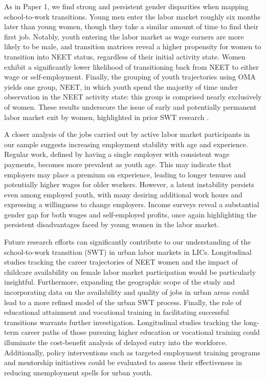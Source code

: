 \documentclass[
  a4paper, twoside, 12pt]{book}
\renewcommand{\hl}[1]{#1}
\begin{document}
\hl{As in Paper 1, we find strong and persistent gender disparities when mapping school-to-work transitions. Young men enter the labor market roughly six months later than young women, though they take a similar amount of time to find their first job. Notably, youth entering the labor market as wage earners are more likely to be male, and transition matrices reveal a higher propensity for women to transition into NEET status, regardless of their initial activity state. Women exhibit a significantly lower likelihood of transitioning back from NEET to either wage or self-employment. Finally, the grouping of youth trajectories using OMA yields one group, NEET, in which youth spend the majority of time under observation in the NEET activity state: this group is comprised nearly exclusively of women. These results underscore the issue of early and potentially permanent labor market exit by women, highlighted in prior SWT research} \autocite{manacorda2017,dedehouanou2019}.

\hl{A closer analysis of the jobs carried out by active labor market participants in our sample suggests increasing employment stability with age and experience. Regular work, defined by having a single employer with consistent wage payments, becomes more prevalent as youth age. This may indicate that employers may place a premium on experience, leading to longer tenures and potentially higher wages for older workers. However, a latent instability persists even among employed youth, with many desiring additional work hours and expressing a willingness to change employers. Income surveys reveal a substantial gender gap for both wages and self-employed profits, once again highlighting the persistent disadvantages faced by young women in the labor market.}

\hl{Future research efforts can significantly contribute to our understanding of the school-to-work transition (SWT) in urban labor markets in LICs. Longitudinal studies tracking the career trajectories of NEET women and the impact of childcare availability on female labor market participation would be particularly insightful. Furthermore, expanding the geographic scope of the study and incorporating data on the availability and quality of jobs in urban areas could lead to a more refined model of the urban SWT process. Finally, the role of educational attainment and vocational training in facilitating successful transitions warrants further investigation. Longitudinal studies tracking the long-term career paths of those pursuing higher education or vocational training could illuminate the cost-benefit analysis of delayed entry into the workforce. Additionally, policy interventions such as targeted employment training programs and mentorship initiatives could be evaluated to assess their effectiveness in reducing unemployment spells for urban youth.}
\end{document}
